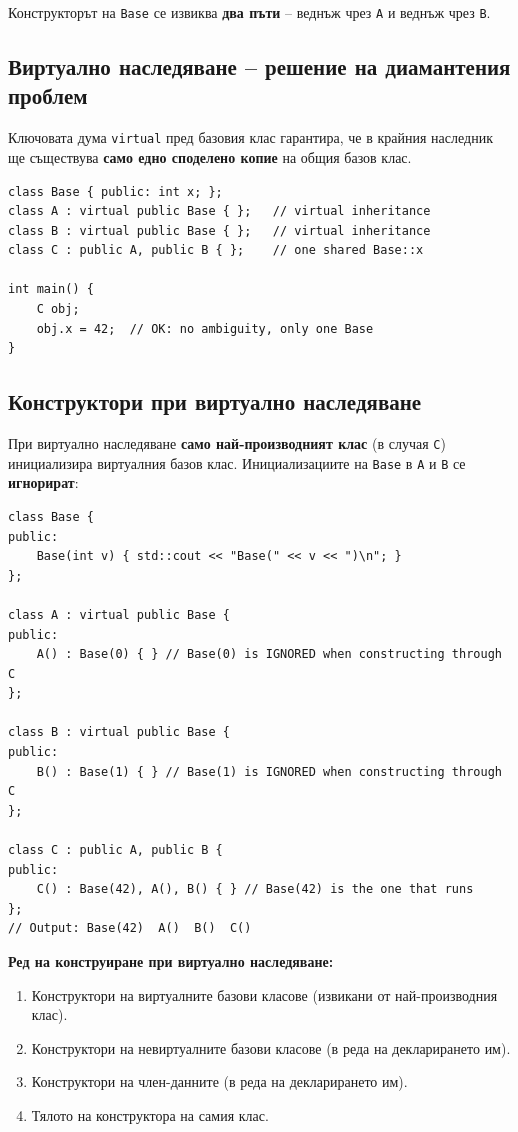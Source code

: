\documentclass{scrartcl}
\begin{document}
\begin{FlushLeft}
Конструкторът на \texttt{Base} се извиква \textbf{два пъти} -- веднъж чрез \texttt{A} и веднъж чрез \texttt{B}.

\subsection{Виртуално наследяване -- решение на диамантения проблем}

Ключовата дума \texttt{virtual} пред базовия клас гарантира, че в крайния наследник ще съществува \textbf{само едно споделено копие} на общия базов клас.

\begin{lstlisting}
class Base { public: int x; };
class A : virtual public Base { };   // virtual inheritance
class B : virtual public Base { };   // virtual inheritance
class C : public A, public B { };    // one shared Base::x

int main() {
    C obj;
    obj.x = 42;  // OK: no ambiguity, only one Base
}
\end{lstlisting}

\subsection{Конструктори при виртуално наследяване}

При виртуално наследяване \textbf{само най-производният клас} (в случая \texttt{C}) инициализира виртуалния базов клас. Инициализациите на \texttt{Base} в \texttt{A} и \texttt{B} се \textbf{игнорират}:

\begin{lstlisting}
class Base {
public:
    Base(int v) { std::cout << "Base(" << v << ")\n"; }
};

class A : virtual public Base {
public:
    A() : Base(0) { } // Base(0) is IGNORED when constructing through C
};

class B : virtual public Base {
public:
    B() : Base(1) { } // Base(1) is IGNORED when constructing through C
};

class C : public A, public B {
public:
    C() : Base(42), A(), B() { } // Base(42) is the one that runs
};
// Output: Base(42)  A()  B()  C()
\end{lstlisting}

\textbf{Ред на конструиране при виртуално наследяване:}
\begin{enumerate}
    \item Конструктори на виртуалните базови класове (извикани от най-производния клас).
    \item Конструктори на невиртуалните базови класове (в реда на декларирането им).
    \item Конструктори на член-данните (в реда на декларирането им).
    \item Тялото на конструктора на самия клас.
\end{enumerate}

\end{FlushLeft}
\end{document}

